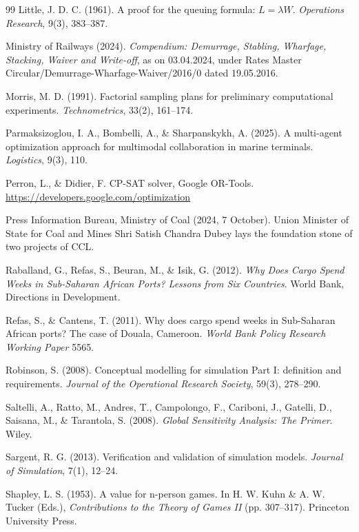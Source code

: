 \begin{thebibliography}{99}
Little, J. D. C. (1961). A proof for the queuing formula: $L = \lambda W$. \textit{Operations Research}, 9(3), 383--387.

Ministry of Railways (2024). \textit{Compendium: Demurrage, Stabling, Wharfage, Stacking, Waiver and Write-off}, as on 03.04.2024, under Rates Master Circular/Demurrage-Wharfage-Waiver/2016/0 dated 19.05.2016.

Morris, M. D. (1991). Factorial sampling plans for preliminary computational experiments. \textit{Technometrics}, 33(2), 161--174.

Parmaksizoglou, I. A., Bombelli, A., \& Sharpanskykh, A. (2025). A multi-agent optimization approach for multimodal collaboration in marine terminals. \textit{Logistics}, 9(3), 110.

Perron, L., \& Didier, F. CP-SAT solver, Google OR-Tools. \url{https://developers.google.com/optimization}

Press Information Bureau, Ministry of Coal (2024, 7 October). Union Minister of State for Coal and Mines Shri Satish Chandra Dubey lays the foundation stone of two projects of CCL.

Raballand, G., Refas, S., Beuran, M., \& Isik, G. (2012). \textit{Why Does Cargo Spend Weeks in Sub-Saharan African Ports? Lessons from Six Countries}. World Bank, Directions in Development.

Refas, S., \& Cantens, T. (2011). Why does cargo spend weeks in Sub-Saharan African ports? The case of Douala, Cameroon. \textit{World Bank Policy Research Working Paper} 5565.

Robinson, S. (2008). Conceptual modelling for simulation Part I: definition and requirements. \textit{Journal of the Operational Research Society}, 59(3), 278--290.

Saltelli, A., Ratto, M., Andres, T., Campolongo, F., Cariboni, J., Gatelli, D., Saisana, M., \& Tarantola, S. (2008). \textit{Global Sensitivity Analysis: The Primer}. Wiley.

Sargent, R. G. (2013). Verification and validation of simulation models. \textit{Journal of Simulation}, 7(1), 12--24.

Shapley, L. S. (1953). A value for n-person games. In H. W. Kuhn \& A. W. Tucker (Eds.), \textit{Contributions to the Theory of Games II} (pp. 307--317). Princeton University Press.


\end{thebibliography}
